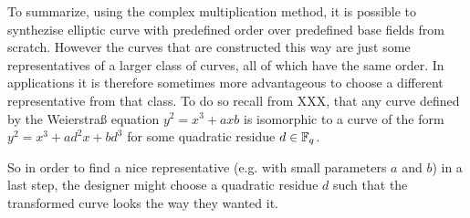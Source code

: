To summarize, using the complex multiplication method, it is possible to synthezise elliptic curve with predefined order over predefined base fields from scratch. However the curves that are constructed this way are just some representatives of a larger class of curves, all of which have the same order. In applications it is therefore sometimes more advantageous to choose a different representative from that class. To do so recall from XXX, that any curve defined by the Weierstraß equation $y^2 = x^3 + ax b$ is isomorphic to a curve of the form $y^2 = x^3 + ad^2 x + bd^3$ for some quadratic residue $d\in \mathbb{F}_q$. 

So in order to find a nice representative (e.g. with small parameters $a$ and $b$) in a last step, the designer might choose a quadratic residue $d$ such that the transformed curve looks the way they wanted it.

